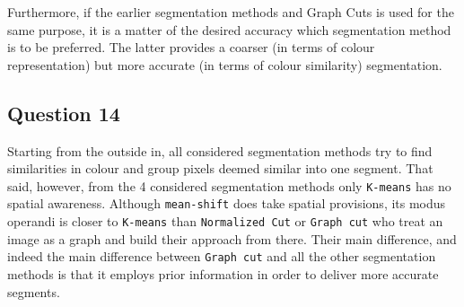 Furthermore, if the earlier segmentation methods and Graph Cuts is used for
the same purpose, it is a matter of the desired accuracy which segmentation method
is to be preferred. The latter provides a coarser (in terms of colour representation)
but more accurate (in terms of colour similarity) segmentation.


\subsection{Question 14}

Starting from the outside in, all considered segmentation methods try to find
similarities in colour and group pixels deemed similar into one segment.
That said, however, from the 4 considered segmentation methods only
\texttt{K-means} has no spatial awareness. Although \texttt{mean-shift} does
take spatial provisions, its modus operandi is closer to \texttt{K-means} than
\texttt{Normalized Cut} or \texttt{Graph cut} who treat an image as a graph
and build their approach from there. Their main difference, and indeed the main
difference between \texttt{Graph cut} and all the other segmentation methods is
that it employs prior information in order to deliver more accurate segments.
